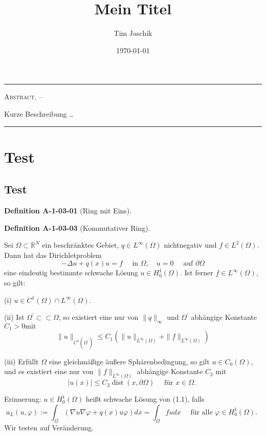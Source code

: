 \documentclass[10pt, letterpaper]{article}
\title{Mein Titel}
\author{Tim Jaschik}
\date{\today}
\renewenvironment{abstract}
  {
    \begin{adjustwidth}{1.5cm}{1.5cm}
    \small
    \textsc{Abstract. –}%
  }
  {
    \end{adjustwidth}
  }
\newcommand{\CustomHeading}[3]{%
  \par\medskip\noindent%
  \textbf{#1 #2} \textnormal{(#3)}.\enskip%
}
\newenvironment{DEF}[2]{\CustomHeading{Definition}{#1}{#2}}{}
\begin{document}
\maketitle
\rule{\textwidth}{0.5pt}
\begin{abstract}
Kurze Beschreibung …
\end{abstract}
\rule{\textwidth}{0.5pt}
\vspace{0.5cm}

\tableofcontents

\pagebreak

\section{Test}

\subsection{Test}


\begin{DEF}{A-1-03-01}{Ring mit Eins}
\end{DEF}


\begin{DEF}{A-1-03-03}{Kommutativer Ring}
Sei $\Omega \subset \mathbb{R}^{N}$ ein beschränktes Gebiet, $q \in L^{\infty}(\Omega)$ nichtnegativ und $f \in L^{2}(\Omega)$. Dann hat das Dirichletproblem
$$
-\Delta u+q(x) u=f \quad \text { in } \Omega, \quad u=0 \quad \text { auf } \partial \Omega
$$
eine eindeutig bestimmte schwache Lösung $u \in H_{0}^{1}(\Omega)$. Ist ferner $f \in L^{\infty}(\Omega)$, so gilt:

(i) $u \in C^{1}(\Omega) \cap L^{\infty}(\Omega)$.

(ii) Ist $\Omega^{\prime} \subset \subset \Omega$, so existiert eine nur von $\|q\|_{\infty}$ und $\Omega^{\prime}$ abhängige Konstante $C_{1}>0 \mathrm{mit}$
$$
\|u\|_{C^{1}\left(\overline{\Omega^{\prime}}\right)} \leq C_{1}\left(\|u\|_{L^{\infty}(\Omega)}+\|f\|_{L^{\infty}(\Omega)}\right)
$$

(iii) Erfüllt $\Omega$ eine gleichmäßige äußere Sphärenbedingung, so gilt $u \in C_{0}(\Omega)$, und es existiert eine nur von $\|f\|_{L^{\infty}(\Omega)}$ abhängige Konstante $C_{2}$ mit
$$
|u(x)| \leq C_{2} \operatorname{dist}(x, \partial \Omega) \quad \text { für } x \in \Omega \text {. }
$$

Erinnerung: $u \in H_{0}^{1}(\Omega)$ heißt schwache Lösung von (1.1), falls
$$
a_{L}(u, \varphi):=\int_{\Omega}(\nabla u \nabla \varphi+q(x) u \varphi) d x=\int_{\Omega} f u d x \quad \text { für alle } \varphi \in H_{0}^{1}(\Omega) \text {. }
$$
Wir testen auf Veränderung.
\end{DEF}
\end{document}
